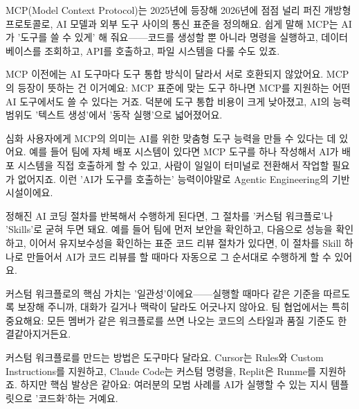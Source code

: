 


MCP(Model Context Protocol)는 2025년에 등장해 2026년에 점점 널리 퍼진 개방형 프로토콜로, AI 모델과 외부 도구 사이의 통신 표준을 정의해요. 쉽게 말해 MCP는 AI가 '도구를 쓸 수 있게' 해 줘요——코드를 생성할 뿐 아니라 명령을 실행하고, 데이터베이스를 조회하고, API를 호출하고, 파일 시스템을 다룰 수도 있죠.

MCP 이전에는 AI 도구마다 도구 통합 방식이 달라서 서로 호환되지 않았어요. MCP의 등장이 뜻하는 건 이거예요: MCP 표준에 맞는 도구 하나면 MCP를 지원하는 어떤 AI 도구에서도 쓸 수 있다는 거죠. 덕분에 도구 통합 비용이 크게 낮아졌고, AI의 능력 범위도 '텍스트 생성'에서 '동작 실행'으로 넓어졌어요.

심화 사용자에게 MCP의 의미는 AI를 위한 맞춤형 도구 능력을 만들 수 있다는 데 있어요. 예를 들어 팀에 자체 배포 시스템이 있다면 MCP 도구를 하나 작성해서 AI가 배포 시스템을 직접 호출하게 할 수 있고, 사람이 일일이 터미널로 전환해서 작업할 필요가 없어지죠. 이런 'AI가 도구를 호출하는' 능력이야말로 Agentic Engineering의 기반 시설이에요.


정해진 AI 코딩 절차를 반복해서 수행하게 된다면, 그 절차를 '커스텀 워크플로'나 'Skills'로 굳혀 두면 돼요. 예를 들어 팀에 먼저 보안을 확인하고, 다음으로 성능을 확인하고, 이어서 유지보수성을 확인하는 표준 코드 리뷰 절차가 있다면, 이 절차를 Skill 하나로 만들어서 AI가 코드 리뷰를 할 때마다 자동으로 그 순서대로 수행하게 할 수 있어요.

커스텀 워크플로의 핵심 가치는 '일관성'이에요——실행할 때마다 같은 기준을 따르도록 보장해 주니까, 대화가 길거나 맥락이 달라도 어긋나지 않아요. 팀 협업에서는 특히 중요해요: 모든 멤버가 같은 워크플로를 쓰면 나오는 코드의 스타일과 품질 기준도 한결같아지거든요.

커스텀 워크플로를 만드는 방법은 도구마다 달라요. Cursor는 Rules와 Custom Instructions를 지원하고, Claude Code는 커스텀 명령을, Replit은 Runme를 지원하죠. 하지만 핵심 발상은 같아요: 여러분의 모범 사례를 AI가 실행할 수 있는 지시 템플릿으로 '코드화'하는 거예요.

